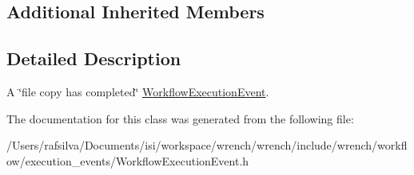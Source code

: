 \subsection*{Additional Inherited Members}


\subsection{Detailed Description}
A \char`\"{}file copy has completed\char`\"{} \hyperlink{classwrench_1_1_workflow_execution_event}{Workflow\+Execution\+Event}. 

The documentation for this class was generated from the following file\+:\begin{DoxyCompactItemize}
\item 
/\+Users/rafsilva/\+Documents/isi/workspace/wrench/wrench/include/wrench/workflow/execution\+\_\+events/Workflow\+Execution\+Event.\+h\end{DoxyCompactItemize}
